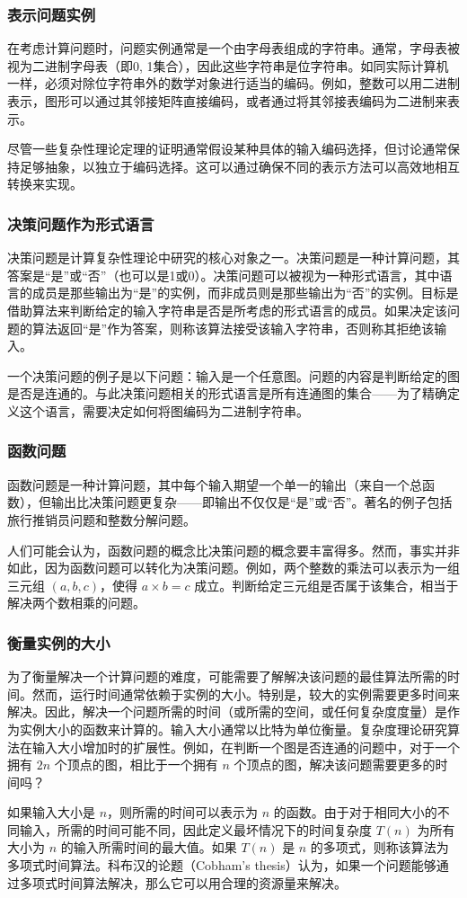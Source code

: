 \subsubsection{表示问题实例}  
在考虑计算问题时，问题实例通常是一个由字母表组成的字符串。通常，字母表被视为二进制字母表（即{0, 1}集合），因此这些字符串是位字符串。如同实际计算机一样，必须对除位字符串外的数学对象进行适当的编码。例如，整数可以用二进制表示，图形可以通过其邻接矩阵直接编码，或者通过将其邻接表编码为二进制来表示。

尽管一些复杂性理论定理的证明通常假设某种具体的输入编码选择，但讨论通常保持足够抽象，以独立于编码选择。这可以通过确保不同的表示方法可以高效地相互转换来实现。
\subsubsection{决策问题作为形式语言}
决策问题是计算复杂性理论中研究的核心对象之一。决策问题是一种计算问题，其答案是“是”或“否”（也可以是1或0）。决策问题可以被视为一种形式语言，其中语言的成员是那些输出为“是”的实例，而非成员则是那些输出为“否”的实例。目标是借助算法来判断给定的输入字符串是否是所考虑的形式语言的成员。如果决定该问题的算法返回“是”作为答案，则称该算法接受该输入字符串，否则称其拒绝该输入。

一个决策问题的例子是以下问题：输入是一个任意图。问题的内容是判断给定的图是否是连通的。与此决策问题相关的形式语言是所有连通图的集合——为了精确定义这个语言，需要决定如何将图编码为二进制字符串。
\subsubsection{函数问题}
函数问题是一种计算问题，其中每个输入期望一个单一的输出（来自一个总函数），但输出比决策问题更复杂——即输出不仅仅是“是”或“否”。著名的例子包括旅行推销员问题和整数分解问题。

人们可能会认为，函数问题的概念比决策问题的概念要丰富得多。然而，事实并非如此，因为函数问题可以转化为决策问题。例如，两个整数的乘法可以表示为一组三元组 \((a, b, c)\)，使得 \(a \times b = c\) 成立。判断给定三元组是否属于该集合，相当于解决两个数相乘的问题。
\subsubsection{衡量实例的大小}
为了衡量解决一个计算问题的难度，可能需要了解解决该问题的最佳算法所需的时间。然而，运行时间通常依赖于实例的大小。特别是，较大的实例需要更多时间来解决。因此，解决一个问题所需的时间（或所需的空间，或任何复杂度度量）是作为实例大小的函数来计算的。输入大小通常以比特为单位衡量。复杂度理论研究算法在输入大小增加时的扩展性。例如，在判断一个图是否连通的问题中，对于一个拥有 \(2n\) 个顶点的图，相比于一个拥有 \(n\) 个顶点的图，解决该问题需要更多的时间吗？

如果输入大小是 \(n\)，则所需的时间可以表示为 \(n\) 的函数。由于对于相同大小的不同输入，所需的时间可能不同，因此定义最坏情况下的时间复杂度 \(T(n)\) 为所有大小为 \(n\) 的输入所需时间的最大值。如果 \(T(n)\) 是 \(n\) 的多项式，则称该算法为多项式时间算法。科布汉的论题（Cobham's thesis）认为，如果一个问题能够通过多项式时间算法解决，那么它可以用合理的资源量来解决。